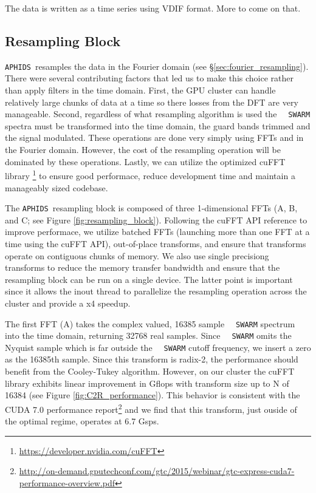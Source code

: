 \documentclass[11pt,preprint]{aastex}
\newcommand{\SWARM}[1]{\texttt{#1\,SWARM}}
\newcommand{\APHIDS}{\texttt{APHIDS}}
\begin{document}
The data is written as a time series using VDIF format.  More to come on that.

\subsection{Resampling Block}\label{sec:resamp_block}

\APHIDS\, resamples the data in the Fourier domain (see \S \ref{sec:fourier_resampling}).  There were several 
contributing factors that led us to make
this choice rather than apply filters in the time domain.  First, the GPU cluster can handle relatively large 
chunks of data at a time so there losses from the DFT are very manageable.  Second, regardless of 
what resampling algorithm is used the \SWARM\, spectra must 
be transformed into the time domain, the guard bands trimmed and the signal modulated.  These operations are done 
very simply using FFTs and in the Fourier domain.  However, the cost of the
resampling operation will be dominated by these operations.  Lastly, we can utilize the optimized cuFFT library
\footnote{\url{https://developer.nvidia.com/cuFFT}} to ensure good performace, reduce development time and 
maintain a manageably sized codebase.

The \APHIDS\, resampling block is composed of three 1-dimensional FFTs (A, B, and C; see Figure \ref{fig:resampling_block}).  
Following the cuFFT API reference to improve performace, we utilize batched
FFTs (launching more than one FFT at a time using the cuFFT API), out-of-place transforms, 
and ensure that transforms operate on contiguous chunks of memory.  We also use single precisiong transforms to 
reduce the memory transfer bandwidth and ensure that 
the resampling block can be run on a single device.  The latter point is important since it allows the inout
thread to parallelize the resampling operation across the cluster and provide a x4 speedup.

The first FFT (A) takes the complex valued, 16385 sample \SWARM\, 
spectrum into the time domain, returning 
32768 real samples.  Since \SWARM\, omits the Nyquist sample which is far outside the \SWARM\, cutoff frequency, 
we insert a zero as the 16385th sample.  Since this transform is radix-2, the performance should benefit from 
the Cooley-Tukey algorithm.  However, on our cluster the cuFFT library exhibits linear improvement in Gflops 
with transform size up to N of 16384 (see Figure \ref{fig:C2R_performance}).  This behavior is consistent with the CUDA 7.0 performance 
report\footnote{\url{http://on-demand.gputechconf.com/gtc/2015/webinar/gtc-express-cuda7-performance-overview.pdf}} 
and we find that this transform, just ouside of the optimal regime, operates at 6.7 Gsps.
\end{document}
